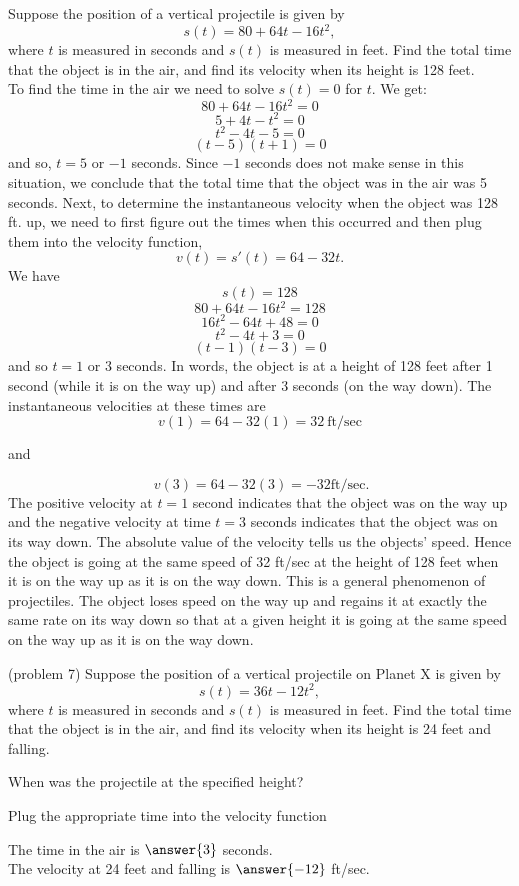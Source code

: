 \documentclass{ximera}
\begin{document}
\begin{example}[example 7]
Suppose the position of a vertical projectile is given by 
\[s(t) = 80 + 64t-16t^2, \]
where $t$ is measured in seconds and $s(t)$ is measured in feet. 
Find the total time that the object is in the air, and find its velocity when its height is 128 feet.\\
 
To find the time in the air we need to solve $s(t) = 0$ for $t$. We get:
\[80 + 64t-16t^2 = 0\]
\[5 + 4t-t^2 = 0\]
\[t^2 -4t -5  = 0\]
\[(t-5)(t+1)  = 0\]
and so, $t =  5$ or $-1$ seconds. Since $-1$ seconds does not make sense in this situation, we conclude that
the total time that the object was in the air was 5 seconds.
Next, to determine the instantaneous velocity when the object was 128 ft. up, 
we need to first figure out the times when this occurred and then plug them into the velocity function, 
\[v(t) = s'(t) = 64 - 32t.\]
We have
\[s(t) = 128 \]
\[80 + 64t -16t^2 = 128\]
\[  16t^2 - 64t + 48 = 0\]
\[  t^2 - 4t + 3 = 0\]
\[  (t-1)(t-3) = 0\]
and so $t= 1$ or $3$ seconds.
In words, the object is at a height of 128 feet after 1 second (while it is on the way up) and after 3 seconds (on the way down).
The instantaneous velocities at these times are
\[v(1) = 64 - 32(1) = 32 \ \text{ft/sec}\]
\begin{center}
  and
\end{center}
\[ \ v(3) = 64 - 32(3) = -32 \text{ft/sec.}\]
The positive velocity at $t= 1$ second indicates that the object was on the way up and the negative velocity 
at time $t=3$ seconds indicates 
that the object was on its way down.  The absolute value of the velocity tells us the objects' speed. 
Hence the object is going at the same speed of 32 ft/sec at the height of 128 feet when it is on the way up as it 
is on the way down.
This is a general phenomenon of projectiles. The object loses speed on the way up and 
regains it at exactly the same rate on its way down so that at a given height it is going at the same 
speed on the way up as it is on the way down.
\end{example}


\begin{problem}(problem 7)
Suppose the position of a vertical projectile on Planet X is given by 
\[s(t) = 36t - 12t^2, \]
where $t$ is measured in seconds and $s(t)$ is measured in feet. 
Find the total time that the object is in the air, and find its velocity when its height is 24 feet and falling.
\begin{hint}
When was the projectile at the specified height?
\end{hint}
\begin{hint}
Plug the appropriate time into the velocity function
\end{hint}

The time in the air is $\answer{3}$ seconds.\\
The velocity at 24 feet and falling is $\answer{-12}$ ft/sec.

\end{problem}


\end{document}
